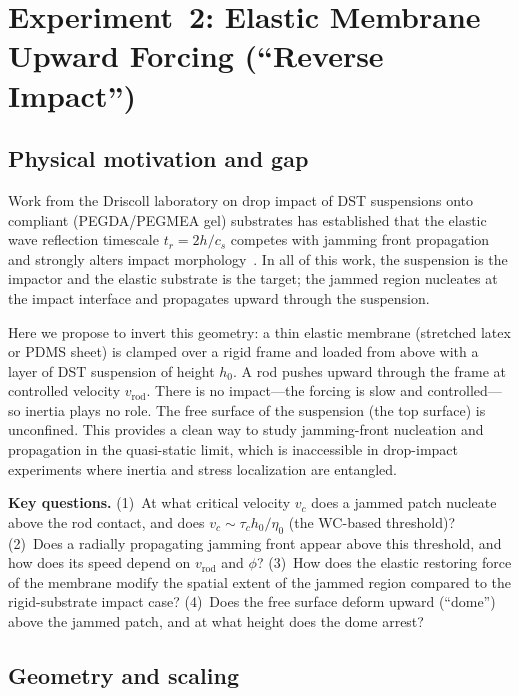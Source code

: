 \documentclass[aps,preprint,superscriptaddress,longbibliography]{revtex4-2}
\newcommand{\tauc}{\tau_c}
\newcommand{\etaz}{\eta_0}
\begin{document}
\section{Experiment~2: Elastic Membrane Upward Forcing (``Reverse Impact'')}
\label{sec:elasticmem}

\subsection{Physical motivation and gap}

Work from the Driscoll laboratory on drop impact of DST suspensions onto
compliant (PEGDA/PEGMEA gel) substrates has established that the elastic wave
reflection timescale $t_r = 2h/c_s$ competes with jamming front propagation
and strongly alters impact morphology~\cite{Mobaseri2025PNAS,Mobaseri2026arXiv}.
In all of this work, the suspension is the impactor and the elastic substrate
is the target; the jammed region nucleates at the impact interface and propagates
upward through the suspension.

Here we propose to invert this geometry: a thin elastic membrane (stretched
latex or PDMS sheet) is clamped over a rigid frame and loaded from above with
a layer of DST suspension of height $h_0$.  A rod pushes upward through the
frame at controlled velocity $v_\text{rod}$.  There is no impact---the forcing
is slow and controlled---so inertia plays no role.  The free surface of the
suspension (the top surface) is unconfined.  This provides a clean way to study
jamming-front nucleation and propagation in the quasi-static limit, which is
inaccessible in drop-impact experiments where inertia and stress localization
are entangled.

\begin{mdframed}[style=questionbox]
\textbf{Key questions.}
(1)~At what critical velocity $v_c$ does a jammed patch nucleate above the rod
contact, and does $v_c \sim \tauc h_0 / \etaz$ (the WC-based threshold)?
(2)~Does a radially propagating jamming front appear above this threshold,
and how does its speed depend on $v_\text{rod}$ and $\phi$?
(3)~How does the elastic restoring force of the membrane modify the spatial
extent of the jammed region compared to the rigid-substrate impact case?
(4)~Does the free surface deform upward (``dome'') above the jammed patch,
and at what height does the dome arrest?
\end{mdframed}

\subsection{Geometry and scaling}
\end{document}
